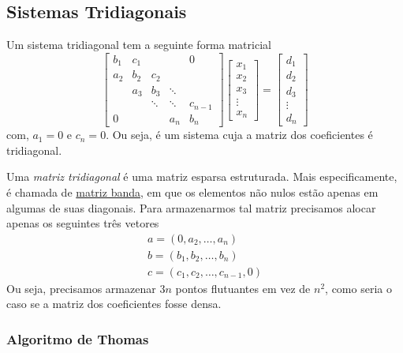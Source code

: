 \subsection{Sistemas Tridiagonais}

Um sistema tridiagonal tem a seguinte forma matricial
\begin{equation}\label{eq:sistridiag}
  \begin{bmatrix}
    b_1 & c_1 & & & 0\\
    a_2 & b_2 & c_2 & & \\
    & a_3 & b_3 & \ddots & \\
    & & \ddots & \ddots & c_{n-1}\\
    0 & & & a_n & b_n
  \end{bmatrix}
  \begin{bmatrix}
    x_1\\
    x_2\\
    x_3\\
    \vdots\\
    x_n
  \end{bmatrix} =
    \begin{bmatrix}
    d_1\\
    d_2\\
    d_3\\
    \vdots\\
    d_n
  \end{bmatrix}
\end{equation}
com, $a_1=0$ e $c_n=0$. Ou seja, é um sistema cuja a matriz dos coeficientes é tridiagonal.

Uma \emph{matriz tridiagonal} é uma matriz esparsa estruturada. Mais especificamente, é chamada de \href{https://pt.wikipedia.org/wiki/Matriz_banda}{matriz banda}, em que os elementos não nulos estão apenas em algumas de suas diagonais. Para armazenarmos tal matriz precisamos alocar apenas os seguintes três vetores
\begin{gather}
  a = (0,a_2,\dotsc,a_n)\\
  b = (b_1,b_2,\dotsc,b_n)\\
  c = (c_1,c_2,\dotsc,c_{n-1},0)
\end{gather}
Ou seja, precisamos armazenar $3n$ pontos flutuantes em vez de $n^2$, como seria o caso se a matriz dos coeficientes fosse densa.

\subsubsection{Algoritmo de Thomas}

